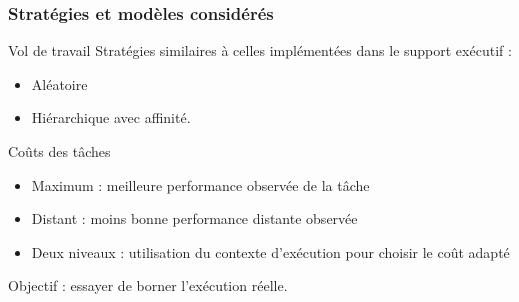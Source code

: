 \documentclass[xcolor={usenames,dvipsnames,svgnames,table}, aspectratio=43]{beamer}
\begin{document}
\begin{frame}
  \frametitle{Stratégies et modèles considérés}

  \begin{block}{Vol de travail}
    Stratégies similaires à celles implémentées dans le support exécutif :
    \begin{itemize}
      \item Aléatoire
      \item Hiérarchique avec affinité.
    \end{itemize}
  \end{block}

  \begin{block}{Coûts des tâches}
    \begin{itemize}
      \item Maximum : meilleure performance observée de la tâche
      \item Distant : moins bonne performance distante observée
      \item Deux niveaux : utilisation du contexte d'exécution pour choisir le coût adapté
    \end{itemize}
  \end{block}

  Objectif : essayer de borner l'exécution réelle.
\end{frame}
\end{document}
